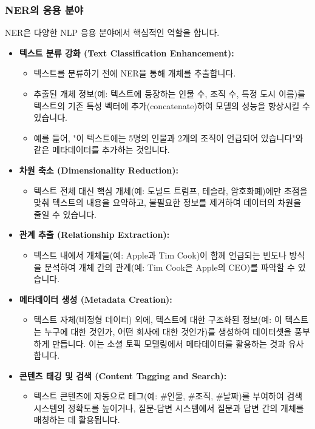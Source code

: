 \documentclass[11pt,a4paper]{article}
\begin{document}
\subsubsection*{NER의 응용 분야}
NER은 다양한 NLP 응용 분야에서 핵심적인 역할을 합니다.
\begin{itemize}
    \item \textbf{텍스트 분류 강화 (Text Classification Enhancement):}
        \begin{itemize}
            \item 텍스트를 분류하기 전에 NER을 통해 개체를 추출합니다.
            \item 추출된 개체 정보(예: 텍스트에 등장하는 인물 수, 조직 수, 특정 도시 이름)를 텍스트의 기존 특성 벡터에 추가(concatenate)하여 모델의 성능을 향상시킬 수 있습니다.
            \item 예를 들어, "이 텍스트에는 5명의 인물과 2개의 조직이 언급되어 있습니다"와 같은 메타데이터를 추가하는 것입니다.
        \end{itemize}
    \item \textbf{차원 축소 (Dimensionality Reduction):}
        \begin{itemize}
            \item 텍스트 전체 대신 핵심 개체(예: 도널드 트럼프, 테슬라, 암호화폐)에만 초점을 맞춰 텍스트의 내용을 요약하고, 불필요한 정보를 제거하여 데이터의 차원을 줄일 수 있습니다.
        \end{itemize}
    \item \textbf{관계 추출 (Relationship Extraction):}
        \begin{itemize}
            \item 텍스트 내에서 개체들(예: Apple과 Tim Cook)이 함께 언급되는 빈도나 방식을 분석하여 개체 간의 관계(예: Tim Cook은 Apple의 CEO)를 파악할 수 있습니다.
        \end{itemize}
    \item \textbf{메타데이터 생성 (Metadata Creation):}
        \begin{itemize}
            \item 텍스트 자체(비정형 데이터) 외에, 텍스트에 대한 구조화된 정보(예: 이 텍스트는 누구에 대한 것인가, 어떤 회사에 대한 것인가)를 생성하여 데이터셋을 풍부하게 만듭니다. 이는 소셜 토픽 모델링에서 메타데이터를 활용하는 것과 유사합니다.
        \end{itemize}
    \item \textbf{콘텐츠 태깅 및 검색 (Content Tagging and Search):}
        \begin{itemize}
            \item 텍스트 콘텐츠에 자동으로 태그(예: #인물, #조직, #날짜)를 부여하여 검색 시스템의 정확도를 높이거나, 질문-답변 시스템에서 질문과 답변 간의 개체를 매칭하는 데 활용됩니다.

\end{itemize}
\end{itemize}
\end{document}
